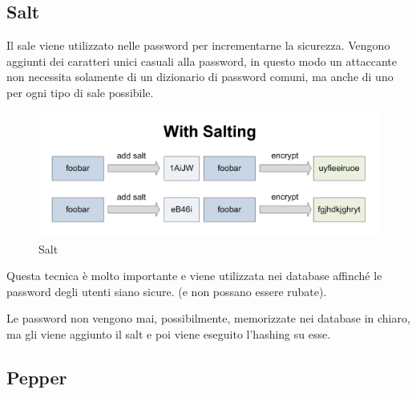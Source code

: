 

\subsection{Salt}

 

\textsf{\small  Il sale viene utilizzato nelle password per incrementarne la sicurezza. Vengono aggiunti dei caratteri unici casuali alla password, in questo modo un attaccante non necessita solamente di un dizionario di password comuni, ma anche di uno per ogni tipo di sale possibile.} %

\begin{figure}[H]
	\centering
	\includegraphics[width=1\textwidth, height=1\textheight, keepaspectratio]{./images/iv_nonce_salt_pepper/withsalting.png}
	\caption{Salt}
	\label{fig:salt}
\end{figure}

 

\textsf{\small Questa tecnica è molto importante e viene utilizzata nei database affinché le password degli utenti siano sicure. (e non possano essere rubate).} %

 

\textsf{\small Le password non vengono mai, possibilmente, memorizzate nei database in chiaro, ma gli viene aggiunto il salt e poi viene eseguito l'hashing su esse.}

\subsection{Pepper}

